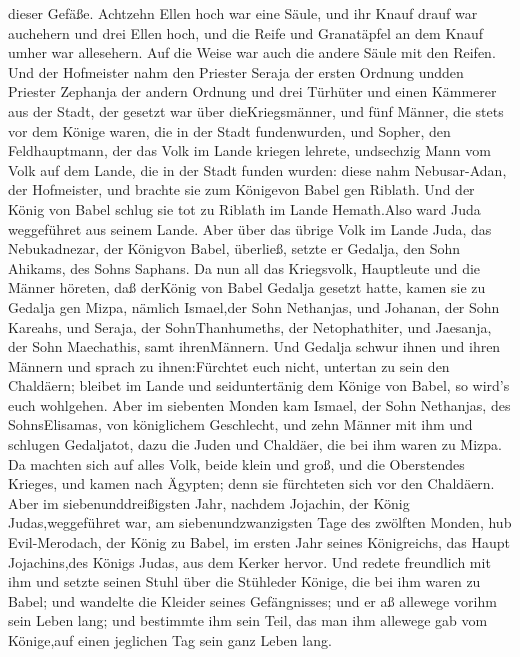 dieser Gefäße.  Achtzehn Ellen hoch war eine Säule, und ihr
Knauf drauf war auchehern und drei Ellen hoch, und die Reife und
Granatäpfel an dem Knauf umher war allesehern. Auf die Weise war auch
die andere Säule mit den Reifen.  Und der Hofmeister nahm
den Priester Seraja der ersten Ordnung undden Priester Zephanja der
andern Ordnung und drei Türhüter  und einen Kämmerer aus
der Stadt, der gesetzt war über dieKriegsmänner, und fünf Männer, die
stets vor dem Könige waren, die in der Stadt fundenwurden, und Sopher,
den Feldhauptmann, der das Volk im Lande kriegen lehrete, undsechzig
Mann vom Volk auf dem Lande, die in der Stadt funden wurden:
 diese nahm Nebusar-Adan, der Hofmeister, und brachte sie
zum Königevon Babel gen Riblath.  Und der König von Babel
schlug sie tot zu Riblath im Lande Hemath.Also ward Juda weggeführet aus
seinem Lande.  Aber über das übrige Volk im Lande Juda, das
Nebukadnezar, der Königvon Babel, überließ, setzte er Gedalja, den Sohn
Ahikams, des Sohns Saphans.  Da nun all das Kriegsvolk,
Hauptleute und die Männer höreten, daß derKönig von Babel Gedalja
gesetzt hatte, kamen sie zu Gedalja gen Mizpa, nämlich Ismael,der Sohn
Nethanjas, und Johanan, der Sohn Kareahs, und Seraja, der
SohnThanhumeths, der Netophathiter, und Jaesanja, der Sohn Maechathis,
samt ihrenMännern.  Und Gedalja schwur ihnen und ihren
Männern und sprach zu ihnen:Fürchtet euch nicht, untertan zu sein den
Chaldäern; bleibet im Lande und seiduntertänig dem Könige von Babel, so
wird's euch wohlgehen.  Aber im siebenten Monden kam
Ismael, der Sohn Nethanjas, des SohnsElisamas, von königlichem
Geschlecht, und zehn Männer mit ihm und schlugen Gedaljatot, dazu die
Juden und Chaldäer, die bei ihm waren zu Mizpa.  Da machten
sich auf alles Volk, beide klein und groß, und die Oberstendes Krieges,
und kamen nach Ägypten; denn sie fürchteten sich vor den Chaldäern.
 Aber im siebenunddreißigsten Jahr, nachdem Jojachin, der
König Judas,weggeführet war, am siebenundzwanzigsten Tage des zwölften
Monden, hub Evil-Merodach, der König zu Babel, im ersten Jahr seines
Königreichs, das Haupt Jojachins,des Königs Judas, aus dem Kerker
hervor.  Und redete freundlich mit ihm und setzte seinen
Stuhl über die Stühleder Könige, die bei ihm waren zu Babel;
 und wandelte die Kleider seines Gefängnisses; und er aß
allewege vorihm sein Leben lang;  und bestimmte ihm sein
Teil, das man ihm allewege gab vom Könige,auf einen jeglichen Tag sein
ganz Leben lang.
